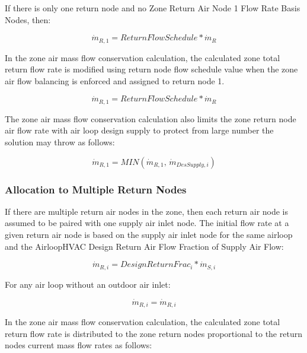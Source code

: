 If there is only one return node and no Zone Return Air Node 1 Flow Rate Basis Nodes, then:

\begin{equation}
{\dot m_{R,1}} = ReturnFlowSchedule*{\dot m_{R}}
\end{equation}

In the zone air mass flow conservation calculation, the calculated zone total return flow rate is modified using return node flow schedule value when the zone air flow balancing is enforced and assigned to return node 1.

\begin{equation}
{\dot m_{R,1}} = ReturnFlowSchedule*{\dot m_{R}}
\end{equation}

The zone air mass flow conservation calculation also limits the zone return node air flow rate with air loop design supply to protect from large number the solution may throw as follows:

\begin{equation}
{\dot m_{R,1}} = MIN\left( {{\dot m_{R,1}},\,{{\dot m}_{DesSupply,i}}} \right)
\end{equation}

\subsubsection{Allocation to Multiple Return Nodes}\label{allocation-to-multiple-return-nodes}

If there are multiple return air nodes in the zone, then each return air node is assumed to be paired with one supply air inlet node. The initial flow rate at a given return air node is based on the supply air inlet node for the same airloop and the AirloopHVAC Design Return Air Flow Fraction of Supply Air Flow:

\begin{equation}
{\dot m_{R,i}} = {DesignReturnFrac_i} * {\dot m_{S,i}}
\end{equation}

For any air loop without an outdoor air inlet:

\begin{equation}
{\dot m_{R,i}} = {\dot m_{R,i}}
\end{equation}

In the zone air mass flow conservation calculation, the calculated zone total return flow rate is distributed to the zone return nodes proportional to the return nodes current mass flow rates as follows:

